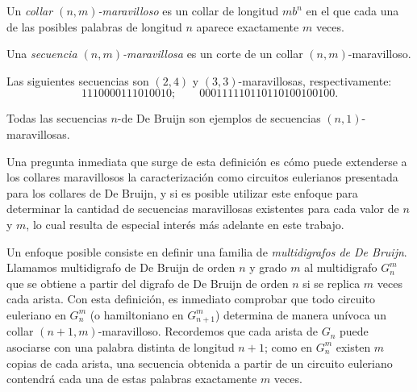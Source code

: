 \begin{definition}
Un \emph{collar $(n,m)$-maravilloso} es un collar de longitud $mb^n$
en el que cada una de las posibles palabras de longitud $n$ aparece
exactamente $m$ veces.

Una \emph{secuencia $(n,m)$-maravillosa} es un corte de un collar
$(n,m)$-maravilloso.
\end{definition}

\begin{examples}
	Las siguientes secuencias son $(2,4)$ y $(3,3)$-maravillosas, respectivamente:
	\[ 1110000111010010; \qquad 000111110110110100100100. \]

	Todas las secuencias $n$-de De Bruijn son ejemplos de secuencias
	$(n,1)$-maravillosas.
\end{examples}

Una pregunta inmediata que surge de esta definición es cómo puede extenderse a
los collares maravillosos la caracterización como circuitos eulerianos
presentada para los collares de De Bruijn, y si es posible utilizar este enfoque
para determinar la cantidad de secuencias maravillosas existentes para cada valor
de $n$ y $m$, lo cual resulta de especial interés más adelante en este
trabajo.

Un enfoque posible consiste en definir una familia de \emph{multidigrafos de De
	Bruijn}.
Llamamos multidigrafo de De Bruijn de orden $n$ y grado $m$ al multidigrafo
$G_n^m$ que se obtiene a partir del digrafo de De Bruijn de orden $n$ si se
replica $m$ veces cada arista.
Con esta definición, es inmediato comprobar que todo circuito euleriano en
$G_n^m$ (o hamiltoniano en $G_{n+1}^m$) determina de manera unívoca un collar
$(n+1, m)$-maravilloso.
Recordemos que cada arista de $G_n$ puede asociarse con una palabra distinta de
longitud $n+1$; como en $G_n^m$ existen $m$ copias de cada arista, una
secuencia obtenida a partir de un circuito euleriano contendrá cada una de
estas palabras exactamente $m$ veces.


